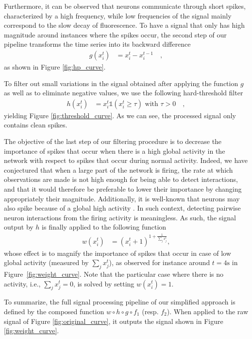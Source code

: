 \documentclass[wcp]{jmlr}
\begin{document}
Furthermore, it can be observed that neurons communicate through short spikes, characterized by a high
frequency, while low frequencies of the signal mainly correspond to the slow
decay of fluorescence. To have a signal that only has high magnitude around instances where the spikes occur, the second step of our pipeline transforms the time series into its backward
difference
\begin{align}
g(x^{t}_{i}) &= x^{t}_i - x^{t-1}_i\quad, \label{eq:high-pass-filter}
\end{align}
as shown in Figure \ref{fig:hp_curve}.

To filter out small variations in the signal obtained after applying the
function $g$ as well as to eliminate negative values, we use the following
hard-threshold filter
\begin{align}\label{eqn:hfilter}
h(x^{t}_i) &= x^{t}_i \mathbb{1}(x^{t}_i \geq \tau) \text{ with } \tau > 0\quad,
\end{align}
yielding Figure \ref{fig:threshold_curve}.
As we can see, the processed signal only contains clean spikes.

The objective of the last step of our filtering procedure is to decrease the
importance of spikes that occur when there is a high global activity in the
network with respect to  spikes that occur during normal activity. Indeed, we
have conjectured that when a large part of the network is firing, the rate at
which observations are made is not high enough for being able to detect
interactions, and that it would therefore be preferable to lower their
importance by changing appropriately their magnitude. Additionally, it is
well-known that neurons may also spike because of a global high activity
\citep{stetter2012model}. In such  context, detecting pairwise neuron
interactions from the firing activity is meaningless. As such,
the signal output by $h$ is finally applied to the following function
\begin{align}
 w(x^{t}_i) &= (x^{t}_i + 1 )^{1 + \frac{1}{\sum_{j} x^{t}_j}}, \label{eq:magnify-filter}
\end{align}
whose effect is to magnify the importance of spikes that occur in case of low
global activity (measured by $\sum_{j} x^{t}_j$), as observed for instance
around $t=4\text{s}$ in Figure~\ref{fig:weight_curve}. Note that the particular case where there
is no activity, i.e., $\sum_{j} x^{t}_j = 0$, is solved by setting $w(x^{t}_i)
= 1$.

To summarize, the full signal processing pipeline of our simplified approach is defined by the composed function $w \circ h \circ g \circ
f_1$ (resp. $f_2$). When applied to the raw signal of Figure
\ref{fig:original_curve}, it outputs the signal shown in Figure
\ref{fig:weight_curve}.
\end{document}
